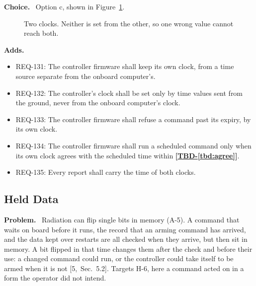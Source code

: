 \documentclass[11pt,a4paper]{article}
\newcommand{\tbd}[1]{\mbox{\textbf{[\hyperref[tbd:#1]{TBD-\ref*{tbd:#1}}]}}}
\newcommand{\field}[1]{\par\needspace{4\baselineskip}\smallskip\noindent\textbf{#1.}~}
\begin{document}
\field{Choice} Option c, shown in Figure~\ref{fig:clocks}.

\begin{figure}[H]
\centering
{}
\caption{Two clocks. Neither is set from the other, so one wrong value cannot
reach both.}
\label{fig:clocks}
\end{figure}

\field{Adds}
\begin{itemize}
\item REQ-131: The controller firmware shall keep its own clock, from a time source separate from the onboard computer's.
\item REQ-132: The controller's clock shall be set only by time values sent from the ground, never from the onboard computer's clock.
\item REQ-133: The controller firmware shall refuse a command past its expiry, by its own clock.
\item REQ-134: The controller firmware shall run a scheduled command only when its own clock agrees with the scheduled time within \tbd{agree}.
\item REQ-135: Every report shall carry the time of both clocks.
\end{itemize}

\subsection{Held Data}
\label{sec:held}
\field{Problem} Radiation can flip single bits in memory (A-5). A command
that waits on board before it runs, the record that an arming command has
arrived, and the data kept over restarts are all checked when they arrive, but
then sit in memory. A bit flipped in that time changes them after the check
and before their use: a changed command could run, or the controller could
take itself to be armed when it is not [5,~Sec.~5.2]. Targets H-6, here a
command acted on in a form the operator did not intend.
\end{document}
